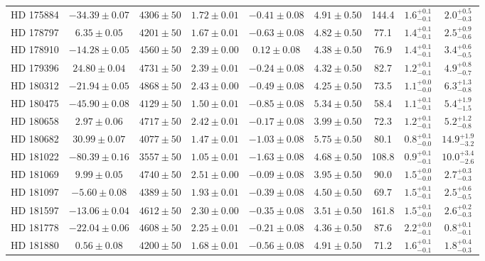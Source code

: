 \begin{table*}
\begin{tabular}{ccccccccc}
HD 175884 & $-34.39 \pm 0.07$ & $4306 \pm 50$ & $1.72 \pm 0.01$ & $-0.41 \pm 0.08$ & $4.91 \pm 0.50$ & 144.4 & $1.6^{+0.1}_{-0.1}$ & $2.0^{+0.5}_{-0.3}$ \\
HD 178797 & $6.35 \pm 0.05$ & $4201 \pm 50$ & $1.67 \pm 0.01$ & $-0.63 \pm 0.08$ & $4.82 \pm 0.50$ & 77.1 & $1.4^{+0.1}_{-0.1}$ & $2.5^{+0.9}_{-0.6}$ \\
HD 178910 & $-14.28 \pm 0.05$ & $4560 \pm 50$ & $2.39 \pm 0.00$ & $0.12 \pm 0.08$ & $4.38 \pm 0.50$ & 76.9 & $1.4^{+0.1}_{-0.1}$ & $3.4^{+0.6}_{-0.5}$ \\
HD 179396 & $24.80 \pm 0.04$ & $4731 \pm 50$ & $2.39 \pm 0.01$ & $-0.24 \pm 0.08$ & $4.32 \pm 0.50$ & 82.7 & $1.2^{+0.1}_{-0.1}$ & $4.9^{+0.8}_{-0.7}$ \\
HD 180312 & $-21.94 \pm 0.05$ & $4868 \pm 50$ & $2.43 \pm 0.00$ & $-0.49 \pm 0.08$ & $4.25 \pm 0.50$ & 73.5 & $1.1^{+0.0}_{-0.0}$ & $6.3^{+1.3}_{-0.8}$ \\
HD 180475 & $-45.90 \pm 0.08$ & $4129 \pm 50$ & $1.50 \pm 0.01$ & $-0.85 \pm 0.08$ & $5.34 \pm 0.50$ & 58.4 & $1.1^{+0.1}_{-0.1}$ & $5.4^{+1.9}_{-1.5}$ \\
HD 180658 & $2.97 \pm 0.06$ & $4717 \pm 50$ & $2.42 \pm 0.01$ & $-0.17 \pm 0.08$ & $3.99 \pm 0.50$ & 72.3 & $1.2^{+0.1}_{-0.1}$ & $5.2^{+1.2}_{-0.8}$ \\
HD 180682 & $30.99 \pm 0.07$ & $4077 \pm 50$ & $1.47 \pm 0.01$ & $-1.03 \pm 0.08$ & $5.75 \pm 0.50$ & 80.1 & $0.8^{+0.1}_{-0.0}$ & $14.9^{+1.9}_{-3.2}$ \\
HD 181022 & $-80.39 \pm 0.16$ & $3557 \pm 50$ & $1.05 \pm 0.01$ & $-1.63 \pm 0.08$ & $4.68 \pm 0.50$ & 108.8 & $0.9^{+0.1}_{-0.1}$ & $10.0^{+3.4}_{-2.6}$ \\
HD 181069 & $9.99 \pm 0.05$ & $4740 \pm 50$ & $2.51 \pm 0.00$ & $-0.09 \pm 0.08$ & $3.95 \pm 0.50$ & 90.0 & $1.5^{+0.0}_{-0.0}$ & $2.7^{+0.3}_{-0.3}$ \\
HD 181097 & $-5.60 \pm 0.08$ & $4389 \pm 50$ & $1.93 \pm 0.01$ & $-0.39 \pm 0.08$ & $4.50 \pm 0.50$ & 69.7 & $1.5^{+0.1}_{-0.1}$ & $2.5^{+0.6}_{-0.5}$ \\
HD 181597 & $-13.06 \pm 0.04$ & $4612 \pm 50$ & $2.30 \pm 0.00$ & $-0.35 \pm 0.08$ & $3.51 \pm 0.50$ & 161.8 & $1.5^{+0.1}_{-0.0}$ & $2.6^{+0.2}_{-0.3}$ \\
HD 181778 & $-22.04 \pm 0.06$ & $4608 \pm 50$ & $2.25 \pm 0.01$ & $-0.21 \pm 0.08$ & $4.36 \pm 0.50$ & 87.6 & $2.2^{+0.0}_{-0.1}$ & $0.8^{+0.1}_{-0.1}$ \\
HD 181880 & $0.56 \pm 0.08$ & $4200 \pm 50$ & $1.68 \pm 0.01$ & $-0.56 \pm 0.08$ & $4.91 \pm 0.50$ & 71.2 & $1.6^{+0.1}_{-0.1}$ & $1.8^{+0.4}_{-0.3}$ \\

\end{tabular}
\end{table*}
